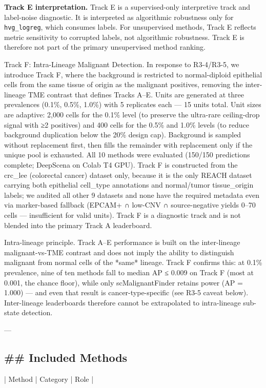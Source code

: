 \documentclass[11pt]{article}
\newcommand{\added}[1]{{\color{trackred}#1}}
\begin{document}
\textbf{Track E interpretation.} Track E is a supervised-only interpretive track and label-noise diagnostic. It is interpreted as algorithmic robustness only for \texttt{hvg\_logreg}, which consumes labels. For unsupervised methods, Track E reflects metric sensitivity to corrupted labels, not algorithmic robustness. Track E is therefore not part of the primary unsupervised method ranking.

\added{Track F: Intra-Lineage Malignant Detection. In response to R3-4/R3-5, we introduce Track F, where the background is restricted to normal-diploid epithelial cells from the same tissue of origin as the malignant positives, removing the inter-lineage TME contrast that defines Tracks A–E. Units are generated at three prevalences (0.1\%, 0.5\%, 1.0\%) with 5 replicates each — 15 units total. Unit sizes are adaptive: 2,000 cells for the 0.1\% level (to preserve the ultra-rare ceiling-drop signal with ≥2 positives) and 400 cells for the 0.5\% and 1.0\% levels (to reduce background duplication below the 20\% design cap). Background is sampled without replacement first, then fills the remainder with replacement only if the unique pool is exhausted. All 10 methods were evaluated (150/150 predictions complete; DeepScena on Colab T4 GPU). Track F is constructed from the crc\_lee (colorectal cancer) dataset only, because it is the only REACH dataset carrying both epithelial cell\_type annotations and normal/tumor tissue\_origin labels; we audited all other 9 datasets and none have the required metadata even via marker-based fallback (EPCAM+ ∩ low-CNV ∩ source-negative yields 0–70 cells — insufficient for valid units). Track F is a diagnostic track and is not blended into the primary Track A leaderboard.

Intra-lineage principle. Track A–E performance is built on the inter-lineage malignant-vs-TME contrast and does not imply the ability to distinguish malignant from normal cells of the *same* lineage. Track F confirms this: at 0.1\% prevalence, nine of ten methods fall to median AP ≤ 0.009 on Track F (most at 0.001, the chance floor), while only scMalignantFinder retains power (AP = 1.000) — and even that result is cancer-type-specific (see R3-5 caveat below). Inter-lineage leaderboards therefore cannot be extrapolated to intra-lineage sub-state detection.}

---

\subsection*{\#\# Included Methods}
| Method | Category | Role |
\end{document}
